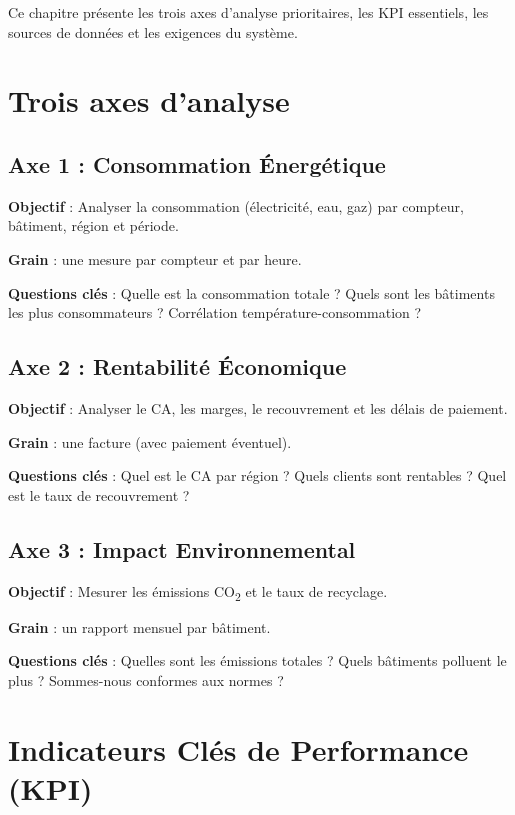 \documentclass[12pt,a4paper]{report}
\begin{document}
Ce chapitre présente les trois axes d'analyse prioritaires, les KPI essentiels, les sources de données et les exigences du système.

\section{Trois axes d'analyse}

\subsection{Axe 1 : Consommation Énergétique}

\textbf{Objectif} : Analyser la consommation (électricité, eau, gaz) par compteur, bâtiment, région et période.

\textbf{Grain} : une mesure par compteur et par heure.

\textbf{Questions clés} : Quelle est la consommation totale ? Quels sont les bâtiments les plus consommateurs ? Corrélation température-consommation ?

\subsection{Axe 2 : Rentabilité Économique}

\textbf{Objectif} : Analyser le CA, les marges, le recouvrement et les délais de paiement.

\textbf{Grain} : une facture (avec paiement éventuel).

\textbf{Questions clés} : Quel est le CA par région ? Quels clients sont rentables ? Quel est le taux de recouvrement ?

\subsection{Axe 3 : Impact Environnemental}

\textbf{Objectif} : Mesurer les émissions CO\textsubscript{2} et le taux de recyclage.

\textbf{Grain} : un rapport mensuel par bâtiment.

\textbf{Questions clés} : Quelles sont les émissions totales ? Quels bâtiments polluent le plus ? Sommes-nous conformes aux normes ?

\section{Indicateurs Clés de Performance (KPI)}
\end{document}
